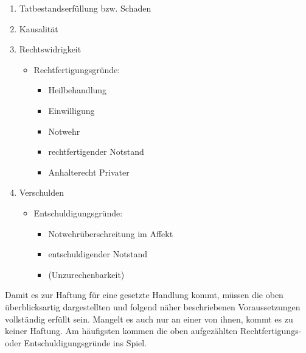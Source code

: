 \begin{enumerate}
    \item Tatbestandserfüllung bzw. Schaden
    \item Kausalit\"at
    \item Rechtswidrigkeit
    
    \begin{itemize}
        \item {\mdseries
        Rechtfertigungsgr\"unde:}
        
        
        \begin{itemize}
            \item {\mdseries
            Heilbehandlung }
            
            \item {\mdseries
            Einwilligung}
            
            \item {\mdseries
            Notwehr}
            
            \item {\mdseries
            rechtfertigender Notstand}
            
            \item {\mdseries
            Anhalterecht Privater}
            
        \end{itemize}
    \end{itemize}
    
    \item Verschulden
    
    \begin{itemize}
        \item{\mdseries
        Entschuldigungsgr\"unde:}
        
        
        \begin{itemize}
            \item Notwehr\"uberschreitung im Affekt
            \item entschuldigender Notstand
            \item (Unzurechenbarkeit)
            
        \end{itemize}
    \end{itemize}
\end{enumerate}

Damit es zur Haftung f\"ur eine gesetzte Handlung kommt, m\"ussen die
oben \"uberblicksartig dargestellten und folgend näher beschriebenen
Voraussetzungen vollständig erf\"ullt sein. Mangelt es auch nur an
einer von ihnen, kommt es zu keiner Haftung. Am häufigsten kommen die
oben aufgezählten Rechtfertigungs- oder Entschuldigungsgr\"unde ins
Spiel.

